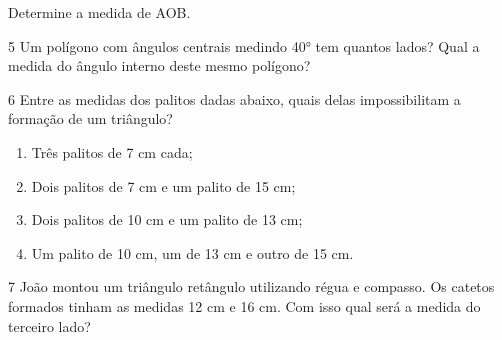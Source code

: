 \begin{escolha}
\begin{escolha}
\begin{escolha}
\begin{escolha}
{\begin{boxmedio}
\begin{boxpeq}
\begin{q°}
\begin{boxmedio}
Determine a medida de AOB.

\begin{boxpeq}


\num{5} Um polígono com ângulos centrais medindo 40° tem quantos lados? Qual
a medida do ângulo interno deste mesmo polígono?

\begin{boxpeq}


\num{6} Entre as medidas dos palitos dadas abaixo, quais delas impossibilitam a
formação de um triângulo?

\begin{enumerate}

  \item Três palitos de 7 cm cada;
 
  \item Dois palitos de 7 cm e um palito de 15 cm;

  \item Dois palitos de 10 cm e um palito de 13 cm;
 
  \item Um palito de 10 cm, um de 13 cm e outro de 15 cm.

\end{enumerate}

\begin{boxmedio}


\num{7} João montou um triângulo retângulo utilizando régua e compasso. Os
catetos formados tinham as medidas 12 cm e 16 cm. Com isso qual será a
medida do terceiro lado?

\begin{boxmedio}


\end{boxmedio}
\end{boxmedio}
\end{boxpeq}
\end{boxpeq}
\end{boxmedio}
\end{q°}
\end{boxpeq}
\end{boxmedio}}
\end{escolha}
\end{escolha}
\end{escolha}
\end{escolha}
